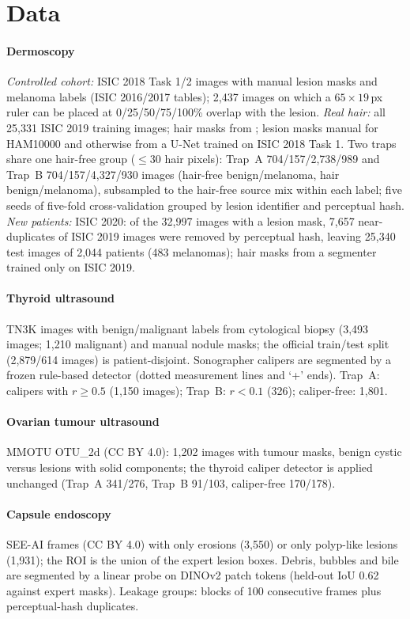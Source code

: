 \section{Data}\label{sec:data}
\paragraph{Dermoscopy} \emph{Controlled cohort:} ISIC 2018 Task 1/2 images with manual lesion masks and melanoma labels
(ISIC 2016/2017 tables); 2,437 images on which a $65\times19$\,px ruler can be placed at 0/25/50/75/100\% overlap with
the lesion. \emph{Real hair:} all 25,331 ISIC 2019 training images; hair masks from \citet{wegley2026artifacts}; lesion
masks manual for HAM10000 \citep{tschandl2018ham} and otherwise from a U-Net trained on ISIC 2018 Task 1. Two traps share
one hair-free group ($\le 30$ hair pixels): Trap~A 704/157/2,738/989 and Trap~B 704/157/4,327/930 images (hair-free
benign/melanoma, hair benign/melanoma), subsampled to the hair-free source mix within each label; five seeds of
five-fold cross-validation grouped by lesion identifier and perceptual hash. \emph{New patients:} ISIC 2020: of the 32,997
images with a lesion mask, 7,657 near-duplicates of ISIC 2019 images were removed by perceptual hash, leaving 25,340 test
images of 2,044 patients (483 melanomas); hair masks from a segmenter trained only on ISIC 2019.

\paragraph{Thyroid ultrasound} TN3K images \citep{gong2021tn3k} with benign/malignant labels from cytological biopsy
\citep{gong2022acl} (3,493 images; 1,210 malignant) and manual nodule masks; the official train/test split
(2,879/614 images) is patient-disjoint. Sonographer calipers are segmented by a frozen rule-based detector (dotted
measurement lines and `+' ends). Trap~A: calipers with $r\ge0.5$ (1,150 images); Trap~B: $r<0.1$ (326); caliper-free:
1,801.

\paragraph{Ovarian tumour ultrasound} MMOTU OTU\_2d \citep{zhao2022mmotu} (CC BY 4.0): 1,202 images with tumour
masks, benign cystic versus lesions with solid components; the thyroid caliper detector is applied unchanged
(Trap~A 341/276, Trap~B 91/103, caliper-free 170/178).

\paragraph{Capsule endoscopy} SEE-AI frames \citep{seeai2023} (CC BY 4.0) with only erosions (3,550) or only
polyp-like lesions (1,931); the ROI is the union of the expert lesion boxes. Debris, bubbles and bile are segmented by
a linear probe on DINOv2 patch tokens (held-out IoU 0.62 against expert masks). Leakage groups: blocks of 100
consecutive frames plus perceptual-hash duplicates.

